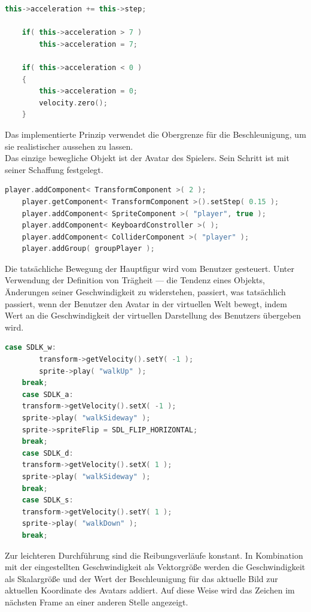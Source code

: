 \documentclass[
  10pt,
  a4paper,
  oneside,
  headers,
  headinclude,
  footinclude,
  BCOR5mm,
]{article}
\begin{document}
\begin{lstlisting}[language=C++]
    this->acceleration += this->step;

    if( this->acceleration > 7 )
        this->acceleration = 7;

    if( this->acceleration < 0 )
    {
        this->acceleration = 0;
        velocity.zero();
    }
\end{lstlisting}

Das implementierte Prinzip verwendet die Obergrenze für die Beschleunigung, um sie realistischer aussehen zu lassen.\\
Das einzige bewegliche Objekt ist der Avatar des Spielers. Sein Schritt ist mit seiner Schaffung festgelegt.

\begin{lstlisting}[language=C++]
    player.addComponent< TransformComponent >( 2 );
    player.getComponent< TransformComponent >().setStep( 0.15 );
    player.addComponent< SpriteComponent >( "player", true );
    player.addComponent< KeyboardConstroller >( );
    player.addComponent< ColliderComponent >( "player" );
    player.addGroup( groupPlayer );
\end{lstlisting}

Die tatsächliche Bewegung der Hauptfigur wird vom Benutzer gesteuert. Unter Verwendung der Definition von Trägheit --- die Tendenz eines Objekts, Änderungen seiner Geschwindigkeit zu widerstehen, passiert, was tatsächlich passiert, wenn der Benutzer den Avatar in der virtuellen Welt bewegt, indem Wert an die Geschwindigkeit der virtuellen Darstellung des Benutzers übergeben wird.\\

\begin{lstlisting}[language=C++]
    case SDLK_w:
        transform->getVelocity().setY( -1 );
        sprite->play( "walkUp" );
	break;
    case SDLK_a:
	transform->getVelocity().setX( -1 );
	sprite->play( "walkSideway" );
	sprite->spriteFlip = SDL_FLIP_HORIZONTAL;
	break;
    case SDLK_d:
	transform->getVelocity().setX( 1 );
	sprite->play( "walkSideway" );
	break;
    case SDLK_s:
	transform->getVelocity().setY( 1 );
	sprite->play( "walkDown" );
	break;
\end{lstlisting}

Zur leichteren Durchführung sind die Reibungsverläufe konstant. In Kombination mit der eingestellten Geschwindigkeit als Vektorgröße werden die Geschwindigkeit als Skalargröße und der Wert der Beschleunigung für das aktuelle Bild zur aktuellen Koordinate des Avatars addiert. Auf diese Weise wird das Zeichen im nächsten Frame an einer anderen Stelle angezeigt.
\end{document}
